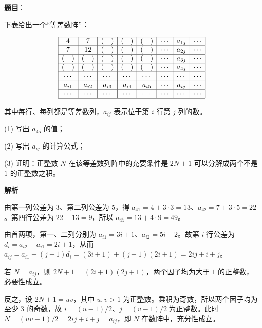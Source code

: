 \begin{answer}

\textbf{题目}：

下表给出一个“等差数阵”：

\nopagebreak[4]
\[
\begin{array}{|c|c|c|c|c|c|c|c|}
\hline
4 & 7 & (\quad) & (\quad) & (\quad) & \cdots & a_{1j} & \cdots \\ \hline
7 & 12 & (\quad) & (\quad) & (\quad) & \cdots & a_{2j} & \cdots \\ \hline
(\quad) & (\quad) & (\quad) & (\quad) & (\quad) & \cdots & a_{3j} & \cdots \\ \hline
(\quad) & (\quad) & (\quad) & (\quad) & (\quad) & \cdots & a_{4j} & \cdots \\ \hline
\cdots & \cdots & \cdots & \cdots & \cdots & \cdots & \cdots & \cdots \\ \hline
a_{i1} & a_{i2} & a_{i3} & a_{i4} & a_{i5} & \cdots & a_{ij} & \cdots \\ \hline
\cdots & \cdots & \cdots & \cdots & \cdots & \cdots & \cdots & \cdots \\ \hline
\end{array}
\]

其中每行、每列都是等差数列，$a_{ij}$ 表示位于第 $i$ 行第 $j$ 列的数。

(1) 写出 $a_{45}$ 的值；

(2) 写出 $a_{ij}$ 的计算公式；

(3) 证明：正整数 $N$ 在该等差数列阵中的充要条件是 $2N+1$ 可以分解成两个不是 $1$ 的正整数之积。

\textbf{解析}


由第一列公差为 $3$、第二列公差为 $5$，得 $a_{41}=4+3\cdot3=13$、$a_{42}=7+3\cdot5=22$。第四行公差为 $22-13=9$，所以 $a_{45}=13+4\cdot9=49$。


由首两项，第一、二列分别为 $a_{i1}=3i+1$、$a_{i2}=5i+2$。故第 $i$ 行公差为 $d_i=a_{i2}-a_{i1}=2i+1$，从而 $a_{ij}=a_{i1}+(j-1)d_i=(3i+1)+(j-1)(2i+1)=2ij+i+j$。


若 $N=a_{ij}$，则 $2N+1=(2i+1)(2j+1)$，两个因子均为大于 $1$ 的正整数，必要性成立。

反之，设 $2N+1=uv$，其中 $u,v>1$ 为正整数。乘积为奇数，所以两个因子均为至少 $3$ 的奇数，故 $i=(u-1)/2$、$j=(v-1)/2$ 为正整数。此时 $N=(uv-1)/2=2ij+i+j=a_{ij}$，即 $N$ 在数阵中，充分性成立。




\end{answer}